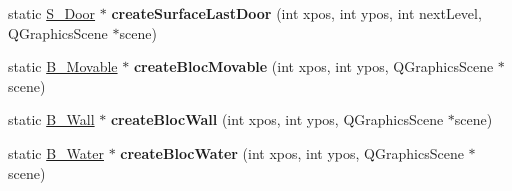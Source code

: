 \begin{DoxyCompactItemize}
\item 
\hypertarget{class_factory___surface_afcbdd2fb2e1ecc891d29780efb5f65cd}{}static \hyperlink{class_s___door}{S\+\_\+\+Door} $\ast$ {\bfseries create\+Surface\+Last\+Door} (int xpos, int ypos, int next\+Level, Q\+Graphics\+Scene $\ast$scene)\label{class_factory___surface_afcbdd2fb2e1ecc891d29780efb5f65cd}

\item 
\hypertarget{class_factory___surface_a80cc5865331117916b66f66336cc6233}{}static \hyperlink{class_b___movable}{B\+\_\+\+Movable} $\ast$ {\bfseries create\+Bloc\+Movable} (int xpos, int ypos, Q\+Graphics\+Scene $\ast$scene)\label{class_factory___surface_a80cc5865331117916b66f66336cc6233}

\item 
\hypertarget{class_factory___surface_a80646d364778824260f5a8abc075801b}{}static \hyperlink{class_b___wall}{B\+\_\+\+Wall} $\ast$ {\bfseries create\+Bloc\+Wall} (int xpos, int ypos, Q\+Graphics\+Scene $\ast$scene)\label{class_factory___surface_a80646d364778824260f5a8abc075801b}

\item 
\hypertarget{class_factory___surface_a03d1d937a82ce191f4699d1eb2635425}{}static \hyperlink{class_b___water}{B\+\_\+\+Water} $\ast$ {\bfseries create\+Bloc\+Water} (int xpos, int ypos, Q\+Graphics\+Scene $\ast$scene)\label{class_factory___surface_a03d1d937a82ce191f4699d1eb2635425}

\end{DoxyCompactItemize}

